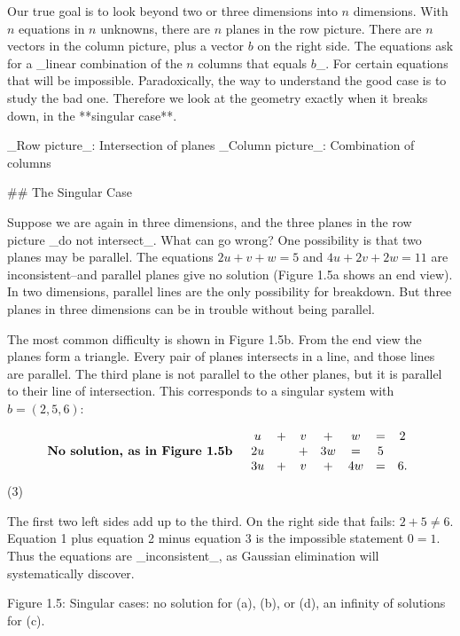 Our true goal is to look beyond two or three dimensions into \(n\) dimensions. With \(n\) equations in \(n\) unknowns, there are \(n\) planes in the row picture. There are \(n\) vectors in the column picture, plus a vector \(b\) on the right side. The equations ask for a _linear combination of the \(n\) columns that equals \(b\)_. For certain equations that will be impossible. Paradoxically, the way to understand the good case is to study the bad one. Therefore we look at the geometry exactly when it breaks down, in the **singular case**.

_Row picture_: Intersection of planes _Column picture_: Combination of columns

## The Singular Case

Suppose we are again in three dimensions, and the three planes in the row picture _do not intersect_. What can go wrong? One possibility is that two planes may be parallel. The equations \(2u+v+w=5\) and \(4u+2v+2w=11\) are inconsistent--and parallel planes give no solution (Figure 1.5a shows an end view). In two dimensions, parallel lines are the only possibility for breakdown. But three planes in three dimensions can be in trouble without being parallel.

The most common difficulty is shown in Figure 1.5b. From the end view the planes form a triangle. Every pair of planes intersects in a line, and those lines are parallel. The third plane is not parallel to the other planes, but it is parallel to their line of intersection. This corresponds to a singular system with \(b=(2,5,6)\):

\[\begin{array}{ccccccc}\mbox{\bf No solution, as in Figure 1.5b}&\begin{array}{ccccccc}u&+&v&+&w&=&2\\ 2u&&+&3w&=&5\\ 3u&+&v&+&4w&=&6.\end{array}\end{array}\] (3)

The first two left sides add up to the third. On the right side that fails: \(2+5\neq 6\). Equation 1 plus equation 2 minus equation 3 is the impossible statement \(0=1\). Thus the equations are _inconsistent_, as Gaussian elimination will systematically discover.

Figure 1.5: Singular cases: no solution for (a), (b), or (d), an infinity of solutions for (c).

 